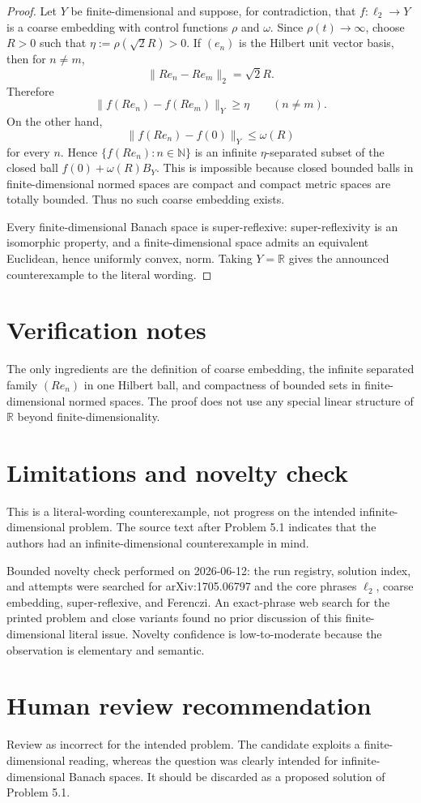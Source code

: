 \documentclass[11pt]{article}
\begin{document}
\begin{proof}
Let \(Y\) be finite-dimensional and suppose, for contradiction, that
\(f:\ell_2\to Y\) is a coarse embedding with control functions \(\rho\) and
\(\omega\).  Since \(\rho(t)\to\infty\), choose \(R>0\) such that
\(\eta:=\rho(\sqrt 2 R)>0\).  If \((e_n)\) is the Hilbert unit vector basis,
then for \(n\ne m\),
\[
  \|R e_n-R e_m\|_2=\sqrt 2 R.
\]
Therefore
\[
  \|f(R e_n)-f(R e_m)\|_Y\ge \eta \qquad(n\ne m).
\]
On the other hand,
\[
  \|f(R e_n)-f(0)\|_Y\le \omega(R)
\]
for every \(n\).  Hence \(\{f(R e_n):n\in\mathbb N\}\) is an infinite
\(\eta\)-separated subset of the closed ball
\(f(0)+\omega(R)B_Y\).  This is impossible because closed bounded balls in
finite-dimensional normed spaces are compact and compact metric spaces are
totally bounded.  Thus no such coarse embedding exists.

Every finite-dimensional Banach space is super-reflexive: super-reflexivity is
an isomorphic property, and a finite-dimensional space admits an equivalent
Euclidean, hence uniformly convex, norm.  Taking \(Y=\mathbb R\) gives the
announced counterexample to the literal wording.
\end{proof}

\section*{Verification notes}

The only ingredients are the definition of coarse embedding, the infinite
separated family \((R e_n)\) in one Hilbert ball, and compactness of bounded
sets in finite-dimensional normed spaces.  The proof does not use any special
linear structure of \(\mathbb R\) beyond finite-dimensionality.

\section*{Limitations and novelty check}

This is a literal-wording counterexample, not progress on the intended
infinite-dimensional problem.  The source text after Problem 5.1 indicates
that the authors had an infinite-dimensional counterexample in mind.

Bounded novelty check performed on 2026-06-12: the run registry, solution
index, and attempts were searched for arXiv:1705.06797 and the core phrases
\(\ell_2\), coarse embedding, super-reflexive, and Ferenczi.  An exact-phrase
web search for the printed problem and close variants found no prior
discussion of this finite-dimensional literal issue.  Novelty confidence is
low-to-moderate because the observation is elementary and semantic.

\section*{Human review recommendation}

Review as incorrect for the intended problem.  The candidate exploits a
finite-dimensional reading, whereas the question was clearly intended for
infinite-dimensional Banach spaces.  It should be discarded as a proposed
solution of Problem 5.1.
\end{document}
